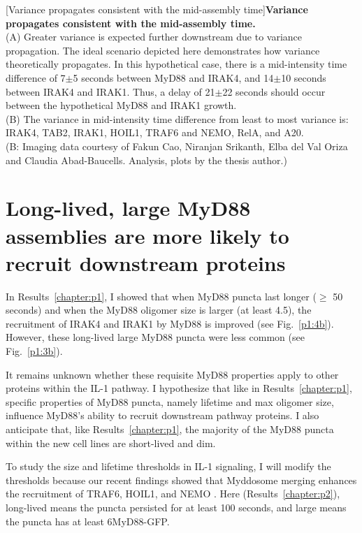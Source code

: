 \begin{centering}
\captionsetup{parbox=none}
[Variance propagates consistent with the mid-assembly time]{\textbf{Variance propagates consistent with the mid-assembly time.}
\vspace{1em}
\\
(A) Greater variance is expected further downstream due to variance propagation. The ideal scenario depicted here demonstrates how variance theoretically propagates. In this hypothetical case, there is a mid-intensity time difference of 7$\pm$5 seconds between MyD88 and IRAK4, and 14$\pm$10 seconds between IRAK4 and IRAK1. Thus, a delay of 21$\pm$22 seconds should occur between the hypothetical MyD88 and IRAK1 growth.
\vspace{1em}
\\
(B) The variance in mid-intensity time difference from least to most variance is: IRAK4, TAB2, IRAK1, HOIL1, TRAF6 and NEMO, RelA, and A20.
\vspace{1em}
\\
(B: Imaging data courtesy of Fakun Cao, Niranjan Srikanth, Elba del Val Oriza and Claudia Abad-Baucells. Analysis, plots by the thesis author.)}
\label{p2:D2}
\end{centering}

\section{Long-lived, large MyD88 assemblies are more likely to recruit downstream proteins}
In Results~\ref{chapter:p1}, I showed that when MyD88 puncta last longer ($\geq$ 50 seconds) and when the MyD88 oligomer size is larger (at least 4.5\times), the recruitment of IRAK4 and IRAK1 by MyD88 is improved (see Fig.~\ref{p1:4b}). However, these long-lived large MyD88 puncta were less common (see Fig.~\ref{p1:3b}).

It remains unknown whether these requisite MyD88 properties apply to other proteins within the IL-1 pathway. I hypothesize that like in Results~\ref{chapter:p1}, specific properties of MyD88 puncta, namely lifetime and max oligomer size, influence MyD88’s ability to recruit downstream pathway proteins. I also anticipate that, like Results~\ref{chapter:p1}, the majority of the MyD88 puncta within the new cell lines are short-lived and dim. 

To study the size and lifetime thresholds in IL-1 signaling, I will modify the thresholds because our recent findings showed that Myddosome merging enhances the recruitment of TRAF6, HOIL1, and NEMO \autocite{Cao_2023}. Here (Results~\ref{chapter:p2}), long-lived means the puncta persisted for at least 100 seconds, and large means the puncta has at least 6\times MyD88-GFP.

